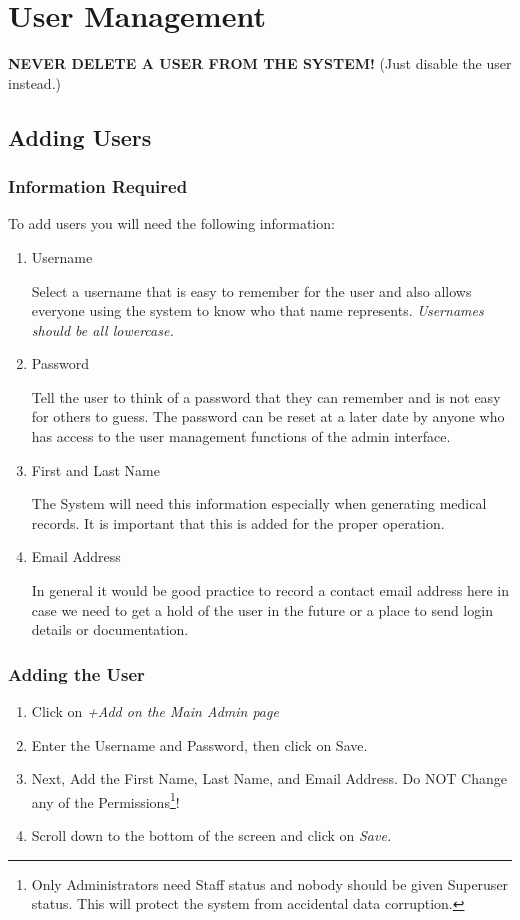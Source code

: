 \section{User Management}

\textbf{NEVER DELETE A USER FROM THE SYSTEM!} (Just disable the user instead.)

\subsection{Adding Users}
\subsubsection{Information Required}

  To add users you will need the following information:

\begin{enumerate}

\item Username

Select a username that is easy to remember for the user and also allows
everyone using the system to know who that name represents. \em{Usernames
should be all lowercase}.

\item Password

Tell the user to think of a password that they can remember and is not
easy for others to guess. The password can be reset at a later date by
anyone who has access to the user management functions of the admin
interface.

\item First and Last Name

The System will need this information especially when generating medical
records. It is important that this is added for the proper operation.

\item Email Address

In general it would be good practice to record a contact email address
here in case we need to get a hold of the user in the future or a place
to send login details or documentation.

\end{enumerate}

\subsubsection{Adding the User}
\begin{enumerate}
\item Click on \em{+Add} on the Main Admin page
\item Enter the Username and Password, then click on Save.
\item Next, Add the First Name, Last Name, and Email Address. Do NOT
Change any of the Permissions\footnote{Only Administrators need Staff status
and nobody should be given Superuser status. This will protect the
system from accidental data corruption.}!
\item Scroll down to the bottom of the screen and click on \em{Save}.
\end{enumerate}

